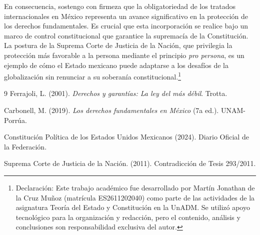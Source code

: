 \documentclass[12pt,spanish,letterpaper,oneside]{article}
\begin{document}
En consecuencia, sostengo con firmeza que la obligatoriedad de los tratados internacionales en M\'exico representa un avance significativo en la protecci\'on de los derechos fundamentales. Es crucial que esta incorporaci\'on se realice bajo un marco de control constitucional que garantice la supremac\'ia de la Constituci\'on. La postura de la Suprema Corte de Justicia de la Naci\'on, que privilegia la protecci\'on m\'as favorable a la persona mediante el principio \emph{pro persona}, es un ejemplo de c\'omo el Estado mexicano puede adaptarse a los desaf\'ios de la globalizaci\'on sin renunciar a su soberan\'ia constitucional.\footnote{Declaraci\'on: Este trabajo acad\'emico fue desarrollado por Mart\'in Jonathan de la Cruz Mu\~noz (matr\'icula ES2611202040) como parte de las actividades de la asignatura Teor\'ia del Estado y Constituci\'on en la UnADM. Se utiliz\'o apoyo tecnol\'ogico para la organizaci\'on y redacci\'on, pero el contenido, an\'alisis y conclusiones son responsabilidad exclusiva del autor.}

\clearpage
\begin{thebibliography}{9}
Ferrajoli, L. (2001). \textit{Derechos y garant\'ias: La ley del m\'as d\'ebil}. Trotta.

Carbonell, M. (2019). \textit{Los derechos fundamentales en M\'exico} (7a ed.). UNAM-Porr\'ua.

Constituci\'on Pol\'itica de los Estados Unidos Mexicanos (2024). Diario Oficial de la Federaci\'on.

Suprema Corte de Justicia de la Naci\'on. (2011). Contradicci\'on de Tesis 293/2011.
\end{thebibliography}
\end{document}
